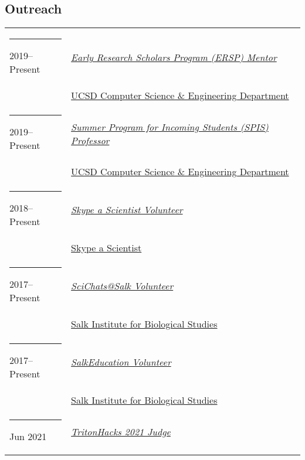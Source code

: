 \documentclass[margin,line]{res}
\begin{document}
\begin{resume}
\section{\sc Outreach}
\begin{longtable}{@{}p{0.7in}p{4in}}\rule{-1mm}{4.5mm}
\hspace*{-4mm} 2019--Present & \href{http://ersp.ucsd.edu/}{\textit{Early Research Scholars Program (ERSP) Mentor}}\\*
\hspace*{-4mm} & \hspace{4mm} \href{http://cse.ucsd.edu}{UCSD Computer Science \& Engineering Department}\\
\hspace*{-4mm} \rule{-1mm}{5mm} 2019--Present & \href{https://sites.google.com/a/eng.ucsd.edu/spis}{\textit{Summer Program for Incoming Students (SPIS) Professor}}\\*
\hspace*{-4mm} & \hspace{4mm} \href{http://cse.ucsd.edu}{UCSD Computer Science \& Engineering Department}\\
\hspace*{-4mm} \rule{-1mm}{5mm} 2018--Present & \href{https://www.skypeascientist.com/}{\textit{Skype a Scientist Volunteer}}\\*
\hspace*{-4mm} & \hspace{4mm} \href{https://www.skypeascientist.com/}{Skype a Scientist}\\
\hspace*{-4mm} \rule{-1mm}{5mm} 2017--Present & \href{http://education.salk.edu/scientist-profile-niema-moshiri/}{\textit{SciChats@Salk Volunteer}}\\*
\hspace*{-4mm} & \hspace{4mm} \href{https://www.salk.edu/}{Salk Institute for Biological Studies}\\
\hspace*{-4mm} \rule{-1mm}{5mm} 2017--Present & \href{https://www.salk.edu/about/education-outreach/}{\textit{SalkEducation Volunteer}}\\*
\hspace*{-4mm} & \hspace{4mm} \href{https://www.salk.edu/}{Salk Institute for Biological Studies}\\
\hspace*{-4mm} \rule{-1mm}{5mm} Jun 2021 & \href{https://www.tritonhacks.org/}{\textit{TritonHacks 2021 Judge}}\\*

\end{longtable}
\end{resume}
\end{document}
